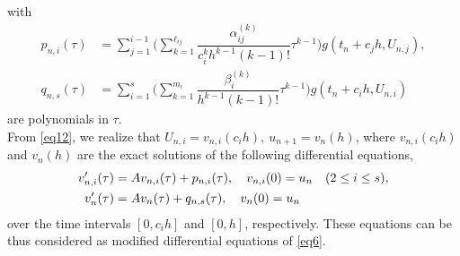 with 
\begin{subequations} \label{eq13}
\begin{align}
 p_{n,i}(\tau)&= \sum_{j=1}^{i-1} \Big(\sum_{k=1}^{\ell_{ij}}\dfrac{\alpha^{(k)}_{ij}}{c^k_i h^{k-1} (k-1)!}\tau^{k-1}\Big) g(t_n +c_j h, U_{n,j}), \label{eq13a} \\
q_{n,s}(\tau) &= \sum_{i=1}^{s} \Big(\sum_{k=1}^{m_i}\dfrac{\beta^{(k)}_{i} }{h^{k-1}(k-1)!}\tau^{k-1} \Big) g(t_n +c_i h, U_{n,i})  \label{eq13b} 
\end{align}
\end{subequations}  
are polynomials in $\tau$.\\
From \eqref{eq12}, we realize that $U_{n,i}=v_{n,i}(c_i h),\ u_{n+1}=v_n(h)$, where $v_{n,i}(c_i h)$ and $v_n(h)$ are the exact solutions of the following differential equations, 
\begin{subequations} \label{eq14}
\begin{align}
v'_{n,i}(\tau)&=Av_{n,i}(\tau) +   p_{n,i}(\tau), \q  v_{n,i}(0)=u_n \q  (2\leq i\leq s), \label{eq14a} \\
v'_n(\tau)&=Av_n(\tau)  +   q_{n,s}(\tau), \q  v_n(0)=u_n \hspace{2.3cm} \label{eq14b}
\end{align}
\end{subequations}  
over the time intervals $[0, c_i h]$ and $[0, h]$, respectively. These equations can be thus considered as modified differential equations of  \eqref{eq6}. 

